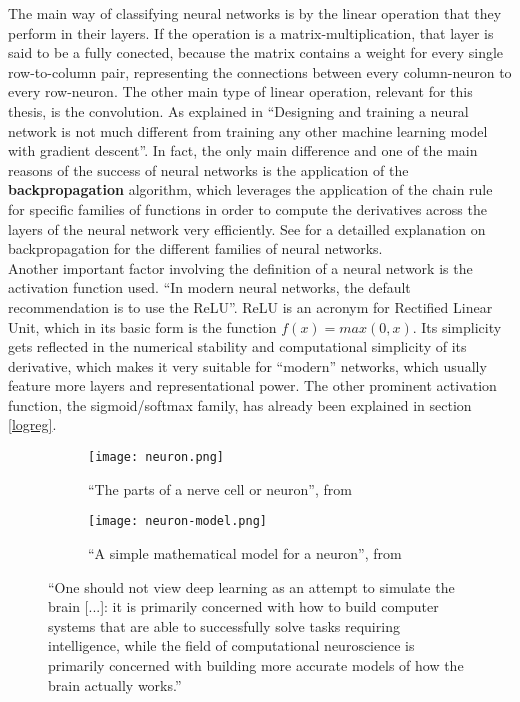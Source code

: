 The main way of classifying neural networks is by the linear operation that they perform in their layers. If the operation is a matrix-multiplication, that layer is said to be a fully conected, because the matrix contains a weight for every single row-to-column pair, representing the connections between every column-neuron to every row-neuron. The other main type of linear operation, relevant for this thesis, is the convolution. As explained in \cite[p.176]{goodfellow} ``Designing and training a neural network is not much different from training any other machine learning model with gradient descent''. In fact, the only main difference and one of the main reasons of the success of neural networks is the application of the \textbf{backpropagation} algorithm, which leverages the application of the chain rule for specific families of functions in order to compute the derivatives across the layers of the neural network very efficiently. See \cite[p.203]{goodfellow} for a detailled explanation on backpropagation for the different families of neural networks.\\

Another important factor involving the definition of a neural network is the activation function used. ``In modern neural networks, the default recommendation is to use the ReLU''\cite[p.173]{goodfellow}. ReLU is an acronym for Rectified Linear Unit, which in its basic form is the function \(f(x) = max(0, x)\). Its simplicity gets reflected in the numerical stability and computational simplicity of its derivative, which makes it very suitable for ``modern'' networks, which usually feature more layers and representational power. The other prominent activation function, the sigmoid/softmax family, has already been explained in section \ref{logreg}.\\

\begin{figure}
  \centering
  \begin{subfigure}[b]{0.35\textwidth}
    \centering
    \texttt{[image: neuron.png]}
    \caption{``The parts of a nerve cell or neuron'', from \cite[p.11]{russell}}
    \label{fig:neuron}
  \end{subfigure}
  \hfill
  \begin{subfigure}[b]{0.6\textwidth}
    \centering
    \texttt{[image: neuron-model.png]}
    \caption{``A simple mathematical model for a neuron'', from \cite[p.728]{russell}}
    \label{fig:neuron-model}
  \end{subfigure}
  \hfill
  \caption{``One should not view deep learning as an attempt to simulate the brain [...]: it is primarily concerned with how to build computer systems that are able to successfully solve tasks requiring intelligence, while the field of computational neuroscience is primarily concerned with building more accurate models of how the brain actually works.''\cite[p.17]{goodfellow}}
  \label{fig:neurons}
\end{figure}


